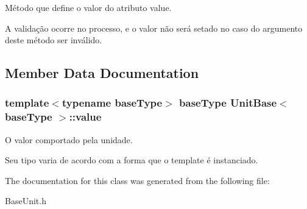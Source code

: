 Método que define o valor do atributo value. 

A validação ocorre no processo, e o valor não será setado no caso do argumento deste método ser inválido. 

\subsection{Member Data Documentation}
\hypertarget{classUnitBase_a1c1ad08b45f07a94e5cf71dee734436b}{
\subsubsection[{value}]{\setlength{\rightskip}{0pt plus 5cm}template$<$typename base\-Type$>$ base\-Type {\bf Unit\-Base}$<$ base\-Type $>$\-::value\hspace{0.3cm}{\ttfamily [protected]}}}\label{d5/db5/classUnitBase_a1c1ad08b45f07a94e5cf71dee734436b}


O valor comportado pela unidade. 

Seu tipo varia de acordo com a forma que o template é instanciado. 

The documentation for this class was generated from the following file\-:\begin{DoxyCompactItemize}
\item 
Base\-Unit.\-h\end{DoxyCompactItemize}
